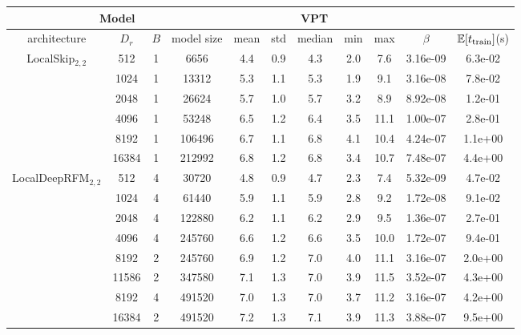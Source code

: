 \begin{table}[!htp]
    \centering
    \begin{tabular}{|c|c|c|c|c|c|c|c|c|c|c|} \hline
\multicolumn{4}{|c|}{Model} &\multicolumn{5}{c|}{VPT} & \multicolumn{2}{c|}{}\\ \hline
architecture & $D_r$ & $B$ & model size & mean & std & median & min & max &$\beta$ & $\mathbb{E}[t_{\rm train}]$(s)\\ \hline\hline
\multirow{6}{*}{LocalSkip$_{2,2}$} & 512 & 1 & 6656 & 4.4 & 0.9 & 4.3 & 2.0 & 7.6 & 3.16e-09 & 6.3e-02\\ \cline{2-11}
 & 1024 & 1 & 13312 & 5.3 & 1.1 & 5.3 & 1.9 & 9.1 & 3.16e-08 & 7.8e-02\\ \cline{2-11}
 & 2048 & 1 & 26624 & 5.7 & 1.0 & 5.7 & 3.2 & 8.9 & 8.92e-08 & 1.2e-01\\ \cline{2-11}
 & 4096 & 1 & 53248 & 6.5 & 1.2 & 6.4 & 3.5 & 11.1 & 1.00e-07 & 2.8e-01\\ \cline{2-11}
 & 8192 & 1 & 106496 & 6.7 & 1.1 & 6.8 & 4.1 & 10.4 & 4.24e-07 & 1.1e+00\\ \cline{2-11}
 & \cellcolor{pink}16384 & \cellcolor{pink}1 & \cellcolor{pink}212992 & \cellcolor{pink}6.8 & \cellcolor{pink}1.2 & \cellcolor{pink}6.8 & \cellcolor{pink}3.4 & \cellcolor{pink}10.7 & \cellcolor{pink}7.48e-07 & \cellcolor{pink}4.4e+00\\ \cline{2-11}
\hline\hline
\multirow{9}{*}{LocalDeepRFM$_{2,2}$} & 512 & 4 & 30720 & 4.8 & 0.9 & 4.7 & 2.3 & 7.4 & 5.32e-09 & 4.7e-02\\ \cline{2-11}
 & 1024 & 4 & 61440 & 5.9 & 1.1 & 5.9 & 2.8 & 9.2 & 1.72e-08 & 9.1e-02\\ \cline{2-11}
 & 2048 & 4 & 122880 & 6.2 & 1.1 & 6.2 & 2.9 & 9.5 & 1.36e-07 & 2.7e-01\\ \cline{2-11}
 & 4096 & 4 & 245760 & 6.6 & 1.2 & 6.6 & 3.5 & 10.0 & 1.72e-07 & 9.4e-01\\ \cline{2-11}
 & 8192 & 2 & 245760 & 6.9 & 1.2 & 7.0 & 4.0 & 11.1 & 3.16e-07 & 2.0e+00\\ \cline{2-11}
 & 11586 & 2 & 347580 & 7.1 & 1.3 & 7.0 & 3.9 & 11.5 & 3.52e-07 & 4.3e+00\\ \cline{2-11}
 & 8192 & 4 & 491520 & 7.0 & 1.3 & 7.0 & 3.7 & 11.2 & 3.16e-07 & 4.2e+00\\ \cline{2-11}
 & \cellcolor{pink}16384 & \cellcolor{pink}2 & \cellcolor{pink}491520 & \cellcolor{pink}7.2 & \cellcolor{pink}1.3 & \cellcolor{pink}7.1 & \cellcolor{pink}3.9 & \cellcolor{pink}11.3 & \cellcolor{pink}3.88e-07 & \cellcolor{pink}9.5e+00\\ \cline{2-11}

\end{tabular}
\end{table}
